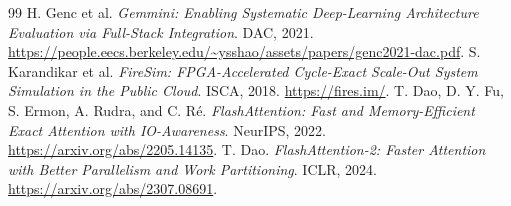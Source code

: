 \begin{thebibliography}{99}
 H. Genc et al. \emph{Gemmini: Enabling Systematic Deep-Learning Architecture Evaluation via Full-Stack Integration}. DAC, 2021. \url{https://people.eecs.berkeley.edu/~ysshao/assets/papers/genc2021-dac.pdf}.
 S. Karandikar et al. \emph{FireSim: FPGA-Accelerated Cycle-Exact Scale-Out System Simulation in the Public Cloud}. ISCA, 2018. \url{https://fires.im/}.
 T. Dao, D. Y. Fu, S. Ermon, A. Rudra, and C. R\'e. \emph{FlashAttention: Fast and Memory-Efficient Exact Attention with IO-Awareness}. NeurIPS, 2022. \url{https://arxiv.org/abs/2205.14135}.
 T. Dao. \emph{FlashAttention-2: Faster Attention with Better Parallelism and Work Partitioning}. ICLR, 2024. \url{https://arxiv.org/abs/2307.08691}.
\end{thebibliography}
